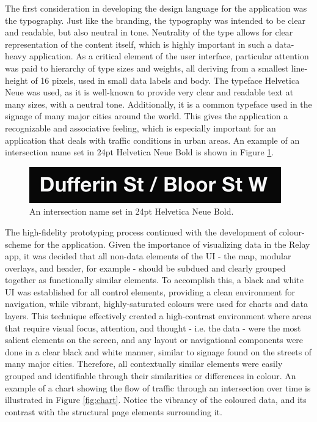 \documentclass{report}
\begin{document}
The first consideration in developing the design language for the application was the typography.
Just like the branding, the typography was intended to be clear and readable, but also neutral in tone.
Neutrality of the type allows for clear representation of the content itself, which is highly important in such a data-heavy application.
As a critical element of the user interface, particular attention was paid to hierarchy of type sizes and weights, all deriving from a smallest line-height of 16 pixels, used in small data labels and body.
The typeface Helvetica Neue was used, as it is well-known to provide very clear and readable text at many sizes, with a neutral tone.
Additionally, it is a common typeface used in the signage of many major cities around the world.
This gives the application a recognizable and associative feeling, which is especially important for an application that deals with traffic conditions in urban areas.
An example of an intersection name set in 24pt Helvetica Neue Bold is shown in Figure \ref{fig:name}. \\

\begin{figure}[htbp!]
  \begin{centering}
    \includegraphics[scale=1]{figures/name.png}
    \caption{An intersection name set in 24pt Helvetica Neue Bold.}
    \label{fig:name}
  \end{centering}
\end{figure}

The high-fidelity prototyping process continued with the development of colour-scheme for the application.
Given the importance of visualizing data in the Relay app, it was decided that all non-data elements of the UI - the map, modular overlays, and header, for example - should be subdued and clearly grouped together as functionally similar elements.
To accomplish this, a black and white UI was established for all control elements, providing a clean environment for navigation, while vibrant, highly-saturated colours were used for charts and data layers.
This technique effectively created a high-contrast environment where areas that require visual focus, attention, and thought - i.e. the data - were the most salient elements on the screen, and any layout or navigational components were done in a clear black and white manner, similar to signage found on the streets of many major cities.
Therefore, all contextually similar elements were easily grouped and identifiable through their similarities or differences in colour.
An example of a chart showing the flow of traffic through an intersection over time is illustrated in Figure \ref{fig:chart}.
Notice the vibrancy of the coloured data, and its contrast with the structural page elements surrounding it. \\
\end{document}
